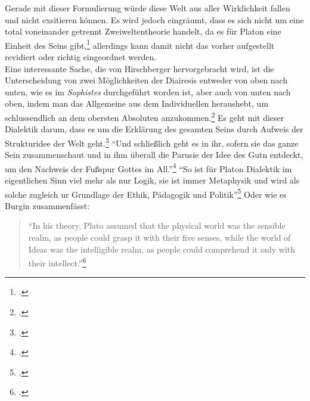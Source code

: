 \documentclass[12pt]{article}
\newcommand*{\zitatblock}[1]{%
    \begin{quote}
    \fontsize{10}{12}\selectfont
    \setlength{\parskip}{1.0em}
    #1
    \end{quote}
}
\begin{document}
Gerade mit dieser Formulierung würde diese Welt aus aller Wirklichkeit fallen und nicht exsitieren können.
Es wird jedoch eingräumt, dass es sich nicht um eine total voneinander getrennt Zweiweltentheorie handelt, da es für Platon eine Einheit des Seins gibt,\footcite[vgl][S. 100]{Hirschberger} allerdings kann damit nicht das vorher aufgestellt revidiert oder richtig eingeordnet werden.\\
Eine interessante Sache, die von Hirschberger hervorgebracht wird, ist die Unterscheidung von zwei Möglichkeiten der Diairesis entweder von oben nach unten, wie es im \emph{Sophistes} durchgeführt worden ist, aber auch von unten nach oben, indem man das Allgemeine aus dem Individuellen heraushebt, um schlussendlich an dem obersten Absoluten anzukommen.\footcite[vgl.][S. 106f.]{Hirschberger} 
Es geht mit dieser Dialektik darum, dass es um die Erklärung des gesamten Seins durch Aufweis der Strukturidee der Welt geht.\footcite[vgl.][S. 107]{Hirschberger}
\enquote{Und schließlich geht es in ihr, sofern sie das ganze Sein zusammenschaut und in ihm überall die Parusie der Idee des Gutn entdeckt, um den Nachweis der Fußspur Gottes im All.}\footcite[][S. 107]{Hirschberger}
\enquote{So ist für Platon Dialektik im eigentlichen Sinn viel mehr als nur Logik, sie ist immer Metaphysik und wird als solche zugleich ur Grundlage der Ethik, Pädagogik und Politik}\footcite[][S. 108]{Hirschberger}
Oder wie es Burgin zusammenfässt: \zitatblock{\enquote{In his theory, Plato assumed that the physical world was the sensible realm, as people could grasp it with their five senses, while the world of Ideas was the intelligible realm, as people could comprehend it only with their intellect.}\footcite[][S. 179]{Burgin}}
\end{document}
